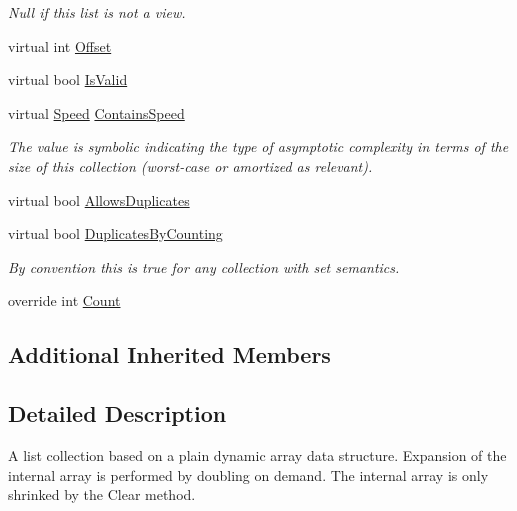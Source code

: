 \begin{DoxyCompactItemize}
\begin{DoxyCompactList}\small\item\em Null if this list is not a view. \end{DoxyCompactList}\item 
virtual int \hyperlink{class_c5_1_1_hashed_array_list_a1fb3ecd68335ab401853035b171b9510}{Offset}
\item 
virtual bool \hyperlink{class_c5_1_1_hashed_array_list_a159bd9790dc21d807212e206bd0defeb}{Is\+Valid}
\item 
virtual \hyperlink{namespace_c5_a615ba88dcdaa8d5a3c5f833a73d7fad6}{Speed} \hyperlink{class_c5_1_1_hashed_array_list_adabe67b56cee8665745ded62f5bb5528}{Contains\+Speed}
\begin{DoxyCompactList}\small\item\em The value is symbolic indicating the type of asymptotic complexity in terms of the size of this collection (worst-\/case or amortized as relevant). \end{DoxyCompactList}\item 
virtual bool \hyperlink{class_c5_1_1_hashed_array_list_ae848f960fa4fd6356992dae988b66ca3}{Allows\+Duplicates}
\item 
virtual bool \hyperlink{class_c5_1_1_hashed_array_list_a12f8301ee0eb89f4f25508a6e22e0105}{Duplicates\+By\+Counting}
\begin{DoxyCompactList}\small\item\em By convention this is true for any collection with set semantics. \end{DoxyCompactList}\item 
override int \hyperlink{class_c5_1_1_hashed_array_list_a46e32f347ac0e80756fdc98970424e8b}{Count}
\end{DoxyCompactItemize}
\subsection*{Additional Inherited Members}


\subsection{Detailed Description}
A list collection based on a plain dynamic array data structure. Expansion of the internal array is performed by doubling on demand. The internal array is only shrinked by the Clear method. 

